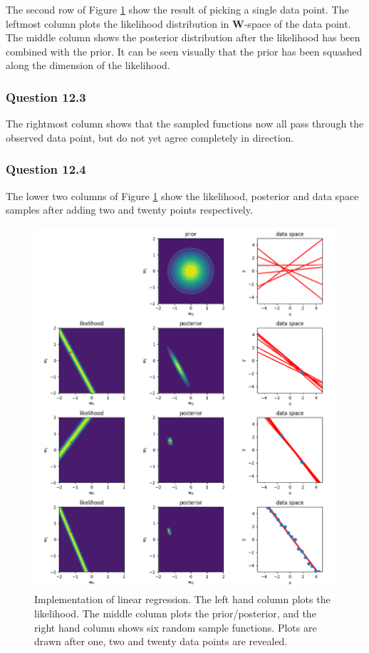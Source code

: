 \documentclass[10pt, a4paper, twocolumn]{article} %
\begin{document}
The second row of Figure \ref{fig:q12} show the result of picking a single data point. The leftmost column plots the likelihood distribution in $\mathbf{W}$-space of the data point. The middle column shows the posterior distribution after the likelihood has been combined with the prior. It can be seen visually that the prior has been squashed along the dimension of the likelihood. 

\subsubsection*{Question 12.3}

The rightmost column shows that the sampled functions now all pass through the observed data point, but do not yet agree completely in direction.

\subsubsection*{Question 12.4}

The lower two columns of Figure \ref{fig:q12} show the likelihood, posterior and data space samples after adding two and twenty points respectively. 

\begin{figure}[htb]
\centerline{\includegraphics[width=\linewidth]{q12.png}}
\caption{Implementation of linear regression. The left hand column plots the likelihood. The middle column plots the prior/posterior, and the right hand column shows six random sample functions. Plots are drawn after one, two and twenty data points are revealed.}
\label{fig:q12}
\end{figure}
\end{document}
